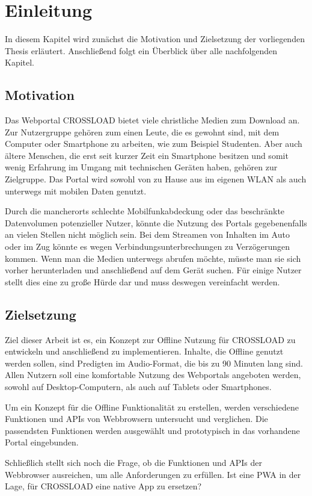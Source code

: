 \chapter{Einleitung}
\label{Kap1}
In diesem Kapitel wird zunächst die Motivation und Zielsetzung der vorliegenden Thesis erläutert. Anschließend folgt ein Überblick über alle nachfolgenden Kapitel.

\section{Motivation}
Das Webportal CROSSLOAD bietet viele christliche Medien zum Download an. Zur Nutzergruppe gehören zum einen Leute, die es gewohnt sind, mit dem Computer oder Smartphone zu arbeiten, wie zum Beispiel Studenten. Aber auch ältere Menschen, die erst seit kurzer Zeit ein Smartphone besitzen und somit wenig Erfahrung im Umgang mit technischen Geräten haben, gehören zur Zielgruppe. Das Portal wird sowohl von zu Hause aus im eigenen WLAN als auch unterwegs mit mobilen Daten genutzt.

Durch die mancherorts schlechte Mobilfunkabdeckung oder das beschränkte Datenvolumen potenzieller Nutzer, könnte die Nutzung des Portals gegebenenfalls an vielen Stellen nicht möglich sein. Bei dem Streamen von Inhalten im Auto oder im Zug könnte es wegen Verbindungsunterbrechungen zu Verzögerungen kommen. Wenn man die Medien unterwegs abrufen möchte, müsste man sie sich vorher herunterladen und anschließend auf dem Gerät suchen. Für einige Nutzer stellt dies eine zu große Hürde dar und muss deswegen vereinfacht werden. 

\section{Zielsetzung}
Ziel dieser Arbeit ist es, ein Konzept zur Offline Nutzung für CROSSLOAD zu entwickeln und anschließend zu implementieren. Inhalte, die Offline genutzt werden sollen, sind Predigten im Audio-Format, die bis zu 90 Minuten lang sind. Allen Nutzern soll eine komfortable Nutzung des Webportals angeboten werden, sowohl auf Desktop-Computern, als auch auf Tablets oder Smartphones. 

Um ein Konzept für die Offline Funktionalität zu erstellen, werden verschiedene Funktionen und \acp{API} von Webbrowsern untersucht und verglichen. Die passendsten Funktionen werden ausgewählt und prototypisch in das vorhandene Portal eingebunden.

Schließlich stellt sich noch die Frage, ob die Funktionen und APIs der Webbrowser ausreichen, um alle Anforderungen zu erfüllen. Ist eine \ac{PWA} in der Lage, für CROSSLOAD eine native App zu ersetzen?

